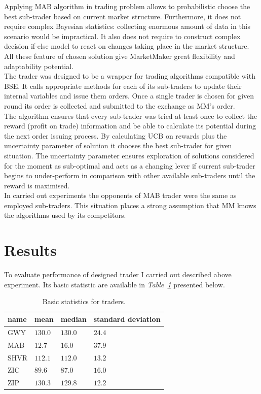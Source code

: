 \documentclass{llncs}
\begin{document}
Applying MAB algorithm in trading problem allows to probabilistic choose the best sub-trader based on current market structure. Furthermore, it does not require complex Bayesian statistics: collecting enormous amount of data in this scenario would be impractical. It also does not require to construct complex decision if-else model to react on changes taking place in the market structure. All these feature of chosen solution give MarketMaker great flexibility and adaptability potential.\\

The trader was designed to be a wrapper for trading algorithms compatible with BSE. It calls appropriate methods for each of its sub-traders to update their internal variables and issue them orders. Once a single trader is chosen for given round its order is collected and submitted to the exchange as MM's order.\\
The algorithm ensures that every sub-trader was tried at least once to collect the reward (profit on trade) information and be able to calculate its potential during the next order issuing process. By calculating UCB on rewards plus the uncertainty parameter of solution it chooses the best sub-trader for given situation. The uncertainty parameter ensures exploration of solutions considered for the moment as sub-optimal and acts as a changing lever if current sub-trader begins to under-perform in comparison with other available sub-traders until the reward is maximised.\\

In carried out experiments the opponents of MAB trader were the same as employed sub-traders. This situation places a strong assumption that MM knows the algorithms used by its competitors.

\section{Results}
To evaluate performance of designed trader I carried out described above experiment. Its basic statistic are available in \emph{Table~\ref{tab:stats}} presented below.\\

\begin{table}[ht]
  \centering
  \begin{tabular}{ p{5em} | p{5em}  p{5em}  p{5em} }
    name & mean & median & standard deviation \\
    \hline
    GWY  & $130.0$ &$ 130.0$ &$ 24.4$ \\
    MAB  & $12.7 $& $16.0 $& $37.9$ \\
    SHVR & $112.1$& $112.0 $& $13.2$\\
    ZIC  & $89.6 $& $87.0 $& $16.0$\\
    ZIP  & $130.3$ &$ 129.8$ & $12.2$
  \end{tabular}
  \vspace*{1em}
  \caption{Basic statistics for traders.\label{tab:stats}}
\end{table}
\end{document}
